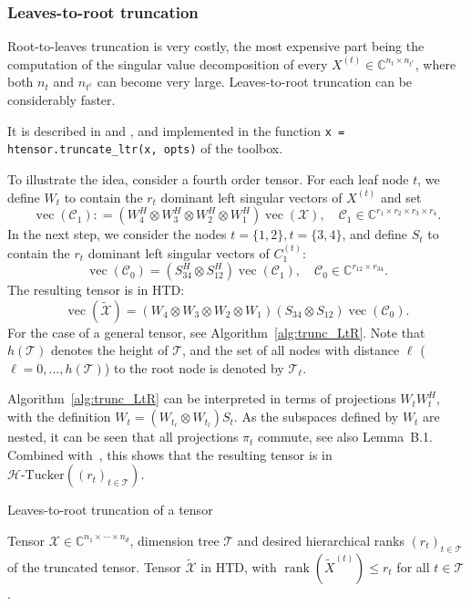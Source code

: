 \documentclass[11pt, a4paper]{article}
\newcommand{\calC}{\mathcal{C}}
\newcommand{\calT}{\mathcal{T}}
\newcommand{\calX}{\mathcal{X}}
\newcommand{\C}{{\mathbb C}}
\newcommand{\HTucker}{\mathcal H\text{-Tucker}}
\DeclareMathOperator{\vect}{vec}
\DeclareMathOperator{\rank}{rank}
\renewcommand{\tilde}{\widetilde}
\begin{document}
\subsubsection{Leaves-to-root truncation} \label{sec:LtR}

Root-to-leaves truncation is very costly, the most expensive part
being the computation of the singular value decomposition of every $X^{(t)}
\in \C^{n_t \times n_{t^c}}$, where both $n_t$ and $n_{t^c}$ can become very large.
Leaves-to-root truncation can be considerably faster.
\begin{submitted}
It is described in \cite[Alg. 2]{Gra10} and \cite[Alg. 5]{KreT11tr}, and implemented in the function \texttt{x = htensor.truncate\_ltr(x, opts)} of the toolbox.
\end{submitted}
\begin{preprint}
To illustrate the idea, consider a fourth order
tensor. For each leaf node $t$, we define $W_t$ to contain the $r_t$ dominant left 
singular vectors of $X^{(t)}$ and set
\[
\vect(\calC_{1}): = (W_4^H \otimes W_3^H \otimes W_2^H \otimes W_1^H) \vect(\calX), \quad \calC_{1} \in \C^{r_1 \times r_2 \times r_3 \times r_4}.
\]
In the next step, we consider the nodes
$t = \{1,2\}, t = \{3,4\}$, and define
$S_t$ to contain the $r_t$ dominant left singular vectors of $C_{1}^{(t)}$:
\[
\vect(\calC_{0}) = (S_{34}^H \otimes S_{12}^H) \vect(\calC_{1}), \quad \calC_{0} \in \C^{r_{12} \times r_{34}}.
\]
The resulting tensor is in HTD:
\[
\vect(\tilde{\calX}) = (W_4 \otimes W_3 \otimes W_2 \otimes W_1)
(S_{34} \otimes S_{12}) \vect(\calC_{0}).
\]
For the case of a general tensor, see
Algorithm~\ref{alg:trunc_LtR}.
Note that $h(\mathcal T)$ denotes the height of $\calT$, and the set of all nodes 
with distance $\ell$ ($\ell = 0,\ldots,h(\calT)$) to the root node is denoted by $\calT_{\ell}$.

Algorithm~\ref{alg:trunc_LtR} can be interpreted in
terms of projections $W_t W_t^H$, with the definition $W_t = (W_{t_r}
\otimes W_{t_l}) S_t$. As the subspaces defined by $W_t$
are nested, it can be seen that all projections $\pi_t$ commute, see also Lemma~B.1.
Combined with~\cite[Lemma 3.15]{Gra10}, this shows that the resulting tensor is
in $\HTucker((r_t)_{t \in \calT})$.
%
\begin{algorithm}
\caption{Leaves-to-root truncation of a tensor}
\label{alg:trunc_LtR}
\begin{algorithmic}\small
  \REQUIRE Tensor $\calX \in \C^{n_1 \times \cdots \times n_d}$,
  dimension tree $\calT$ and desired hierarchical ranks $(r_t)_{t \in
    \calT}$ of the truncated tensor.
  \ENSURE Tensor $\tilde{\calX}$ in HTD, with $\rank (\tilde{X}^{(t)}) \le r_t$ for all $t \in \calT$.
  

\end{algorithmic}
\end{algorithm}
\end{preprint}
\end{document}
